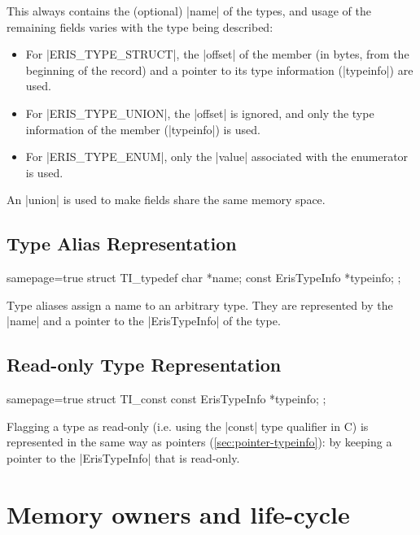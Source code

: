 \noindent
This always contains the (optional) \Mc|name| of the types, and usage of the
remaining fields varies with the type being described:

\begin{itemize}
  \item For \Mc|ERIS_TYPE_STRUCT|, the \Mc|offset| of the member (in bytes,
    from the beginning of the record) and a pointer to its type information
    (\Mc|typeinfo|) are used.
  \item For \Mc|ERIS_TYPE_UNION|, the \Mc|offset| is ignored, and only the
    type information of the member (\Mc|typeinfo|) is used.
  \item For \Mc|ERIS_TYPE_ENUM|, only the \Mc|value| associated with the
    enumerator is used.
\end{itemize}

\noindent
An \Mc|union| is used to make fields share the same memory space.


\subsection{Type Alias Representation}

\begin{ccode*}{samepage=true}
  struct TI_typedef {
    char               *name;
    const ErisTypeInfo *typeinfo;
  };
\end{ccode*}

Type aliases assign a name to an arbitrary type. They are represented by the
\Mc|name| and a pointer to the \Mc|ErisTypeInfo| of the type.


\subsection{Read-only Type Representation}

\begin{ccode*}{samepage=true}
  struct TI_const {
    const ErisTypeInfo *typeinfo;
  };
\end{ccode*}

\noindent
Flagging a type as read-only (i.e. using the \Mc|const| type qualifier in C)
is represented in the same way as pointers (\autoref{sec:pointer-typeinfo}):
by keeping a pointer to the \Mc|ErisTypeInfo| that is read-only.


\section{Memory owners and life-cycle}

